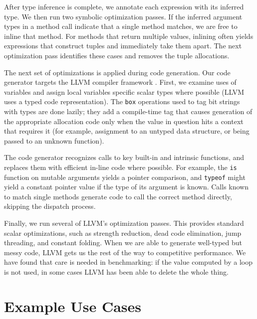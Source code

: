 \documentclass[9pt]{sigplanconf}
\newcommand{\Matlab}{MATLAB\textsuperscript{\tiny\textregistered}}
\begin{document}
After type inference is complete, we annotate each expression with its
inferred type. We then run two symbolic optimization passes.
If the inferred argument types in a method call
indicate that a single method matches, we are free to inline that method.
For methods that return multiple values, inlining often yields
expressions that construct tuples and immediately take them apart. The
next optimization pass identifies these cases and removes the tuple
allocations.

The next set of optimizations is applied during code generation.
Our code generator targets the LLVM compiler framework \cite{LLVM}.
First, we examine uses of variables and assign local variables specific
scalar types where possible (LLVM uses a typed code representation).
The {\tt box} operations used to tag bit strings with types are done
lazily; they add a compile-time tag that causes generation of the
appropriate allocation code only when the value in question hits a context
that requires it (for example, assignment to an untyped data structure,
or being passed to an unknown function).

The code generator recognizes calls to key built-in and intrinsic functions,
and replaces them with efficient in-line code where possible. For example,
the {\tt is} function on mutable arguments yields a pointer comparison, and
{\tt typeof} might
yield a constant pointer value if the type of its argument is known.
Calls known to match single methods generate code to call the correct
method directly, skipping the dispatch process.

Finally, we run several of LLVM's optimization passes.
This provides standard scalar optimizations, such as
strength reduction, dead code elimination, jump threading, and constant
folding. When
we are able to generate well-typed but messy code, LLVM gets us the
rest of the way to competitive performance. We have found that care
is needed in benchmarking: if the value computed by a loop is not
used, in some cases LLVM has been able to delete the whole thing.


\section{Example Use Cases}

\end{document}
